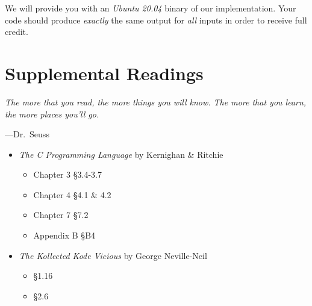 \documentclass[11pt]{article}
\begin{document}
We will provide you with an \emph{Ubuntu 20.04} binary of our implementation.
Your code should produce \emph{exactly} the same output for \emph{all} inputs in
order to receive full credit.


\section{Supplemental Readings}

\epigraph{\emph{The more that you read, the more things you will know. The
more that you learn, the more places you'll go.}}{---Dr.\ Seuss}

\begin{itemize}
  \item \textit{The C Programming Language} by Kernighan \& Ritchie
  \begin{itemize}
    \item Chapter 3 \S 3.4-3.7
    \item Chapter 4 \S 4.1 \& 4.2
    \item Chapter 7 \S 7.2
    \item Appendix B \S B4
  \end{itemize}
\item \textit{The Kollected Kode Vicious} by George Neville-Neil
\begin{itemize}
\item \S 1.16
\item \S 2.6
\end{itemize}
\end{itemize}
\end{document}
